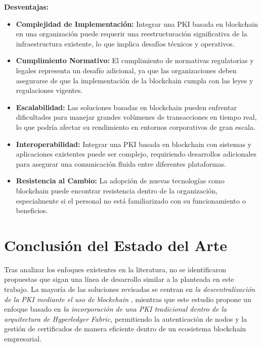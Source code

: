 \textbf{Desventajas:}

\begin{itemize}
  \item \textbf{Complejidad de Implementación:} Integrar una PKI basada en blockchain en una organización puede requerir una reestructuración significativa de la infraestructura existente, lo que implica desafíos técnicos y operativos.
  \item \textbf{Cumplimiento Normativo:} El cumplimiento de normativas regulatorias y legales representa un desafío adicional, ya que las organizaciones deben asegurarse de que la implementación de la blockchain cumpla con las leyes y regulaciones vigentes.
  \item \textbf{Escalabilidad:} Las soluciones basadas en blockchain pueden enfrentar dificultades para manejar grandes volúmenes de transacciones en tiempo real, lo que podría afectar su rendimiento en entornos corporativos de gran escala.
  \item \textbf{Interoperabilidad:} Integrar una PKI basada en blockchain con sistemas y aplicaciones existentes puede ser complejo, requiriendo desarrollos adicionales para asegurar una comunicación fluida entre diferentes plataformas.
  \item \textbf{Resistencia al Cambio:} La adopción de nuevas tecnologías como blockchain puede encontrar resistencia dentro de la organización, especialmente si el personal no está familiarizado con su funcionamiento o beneficios.
\end{itemize}

\section*{Conclusión del Estado del Arte}
Tras analizar los enfoques existentes en la literatura, no se identificaron propuestas que sigan una línea de desarrollo similar a la planteada en este trabajo. La mayoría de las soluciones revisadas se centran en \textit{la descentralización de la PKI mediante el uso de blockchain }, mientras que este estudio propone un enfoque basado en \textit{la incorporación de una PKI tradicional dentro de la arquitectura de Hyperledger Fabric}, permitiendo la autenticación de nodos y la gestión de certificados de manera eficiente dentro de un ecosistema blockchain empresarial.

